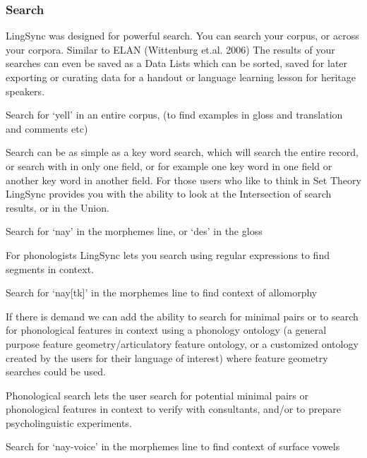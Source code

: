 \documentclass[letterpaper, 12pt, dvips]{mitwpl}
\begin{document}
\subsubsection{Search}

LingSync was designed for powerful search. You can search your corpus, or across your corpora. Similar to ELAN (Wittenburg et.al. 2006) The results of your searches can even be saved as a Data Lists which can be sorted, saved for later exporting or curating data for a handout or language learning lesson for heritage speakers. 


\begin{exe}
	\ex Search for  `yell' in an entire corpus, (to find examples in gloss and translation and comments etc)
\end{exe}

Search can be as simple as a key word search, which will search the entire record, or search with in only one field, or for example one key word in one field or another key word in another field. For those users who like to think in Set Theory LingSync provides you with the ability to look at the Intersection of search results, or in the Union. 

\begin{exe}
	\ex Search for  `nay' in the morphemes line, or `des' in the gloss
\end{exe}

For phonologists LingSync lets you search using regular expressions to find segments in context.


\begin{exe}
	\ex Search for  `nay[tk]' in the morphemes line to find context of allomorphy
\end{exe}

If there is demand we can add the ability to search for minimal pairs or to search for phonological features in context using a phonology ontology (a general purpose feature geometry/articulatory feature ontology, or a customized ontology created by the users for their language of interest)  where feature geometry searches could be used. 

Phonological search lets the user search for potential minimal pairs or phonological features in context to verify with consultants, and/or to prepare psycholinguistic experiments. 

\begin{exe}
	\ex Search for  `nay-voice' in the morphemes line to find context of surface vowels
\end{exe}
\end{document}
